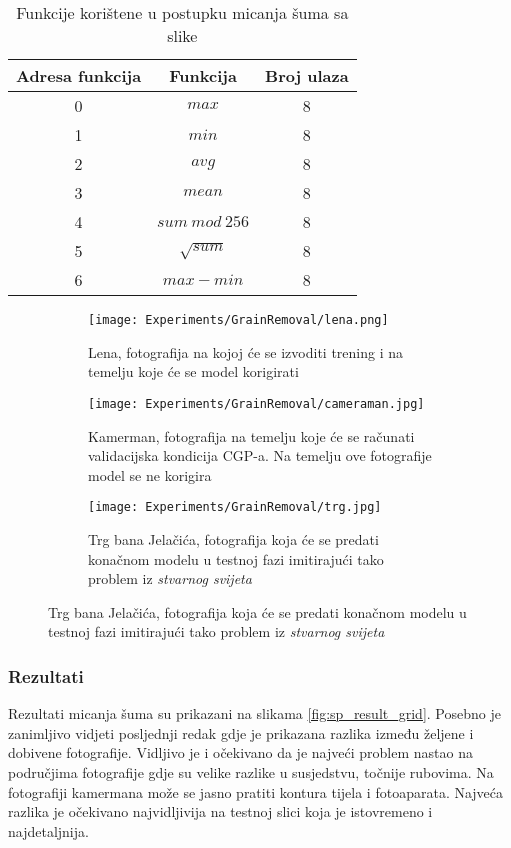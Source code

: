 \begin{table}
	\centering
	\begin{tabular}{||c c c||}
		\hline
		Adresa funkcija & Funkcija & Broj ulaza \\ [0.5ex]
		\hline \hline
		0 & $max$ & 8 \\
		1 & $min$ & 8 \\ 
		2 & $avg$ & 8 \\ 
		3 & $mean$ & 8 \\ 
		4 & $sum\ mod\ 256$ & 8 \\ 
		5 & $\sqrt{sum}$ & 8 \\ 
		6 & $max - min$ & 8 \\ [1ex]
		\hline
	\end{tabular}
	\caption{Funkcije korištene u postupku micanja šuma sa slike}
	\label{table:sp_function_set}
\end{table}

\begin{figure}
	\caption{Fotografije na koje će biti primjenjen šum korištene u trening, validacijskoj i testnoj fazi}
	\begin{subfigure}[t]{0.45\textwidth}
		\texttt{[image: Experiments/GrainRemoval/lena.png]}
		\caption{Lena, fotografija na kojoj će se izvoditi trening i na temelju koje će se model korigirati}
		\label{fig:sp_train_sample}
	\end{subfigure}
	\begin{subfigure}[t]{0.45\textwidth}
		\texttt{[image: Experiments/GrainRemoval/cameraman.jpg]}
		\caption{Kamerman, fotografija na temelju koje će se računati validacijska kondicija CGP-a. Na temelju ove fotografije model se ne korigira}
		\label{fig:sp_val_sample}
	\end{subfigure}
	\begin{subfigure}[t]{0.45\textwidth}
		\texttt{[image: Experiments/GrainRemoval/trg.jpg]}
		\caption{Trg bana Jelačića, fotografija koja će se predati konačnom modelu u testnoj fazi imitirajući tako problem iz \emph{stvarnog svijeta}}
		\label{fig:sp_test_sample}
	\end{subfigure}
	\label{fig:sp_samples}
\end{figure}

\subsubsection{Rezultati}
Rezultati micanja šuma su prikazani na slikama \ref{fig:sp_result_grid}.
Posebno je zanimljivo vidjeti posljednji redak gdje je prikazana razlika između željene i dobivene fotografije.
Vidljivo je i očekivano da je najveći problem nastao na područjima fotografije gdje su velike razlike u susjedstvu, točnije rubovima.
Na fotografiji kamermana može se jasno pratiti kontura tijela i fotoaparata.
Najveća razlika je očekivano najvidljivija na testnoj slici koja je istovremeno i najdetaljnija.

